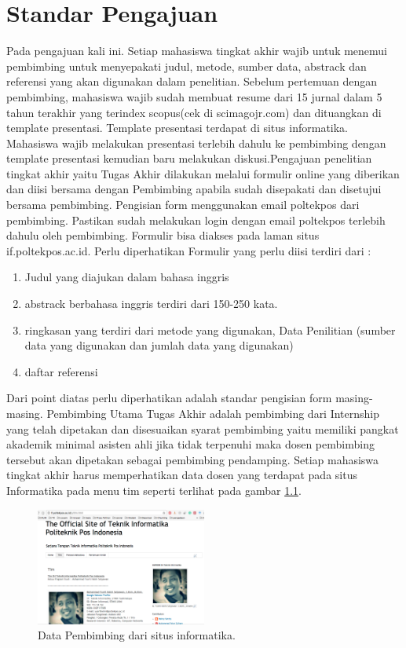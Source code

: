 \chapter{Standar Pengajuan}

Pada pengajuan kali ini. Setiap mahasiswa tingkat akhir wajib untuk menemui pembimbing untuk menyepakati judul, metode, sumber data, abstrack dan referensi yang akan digunakan dalam penelitian. Sebelum pertemuan dengan pembimbing, mahasiswa wajib sudah membuat resume dari 15 jurnal dalam 5 tahun terakhir yang terindex scopus(cek di scimagojr.com) dan dituangkan di template presentasi. Template presentasi terdapat di situs informatika. Mahasiswa wajib melakukan presentasi terlebih dahulu ke pembimbing dengan template presentasi kemudian baru melakukan diskusi.Pengajuan penelitian tingkat akhir yaitu Tugas Akhir dilakukan melalui formulir online yang diberikan dan diisi bersama dengan Pembimbing apabila sudah disepakati dan disetujui bersama pembimbing. Pengisian form menggunakan email poltekpos dari pembimbing. Pastikan sudah melakukan login dengan email poltekpos terlebih dahulu oleh pembimbing. Formulir bisa diakses pada laman situs if.poltekpos.ac.id. Perlu diperhatikan Formulir yang perlu diisi terdiri dari :
\begin{enumerate}
\item Judul yang diajukan dalam bahasa inggris
\item abstrack berbahasa inggris terdiri dari 150-250 kata.
\item ringkasan yang terdiri dari metode yang digunakan, Data Penilitian (sumber data yang digunakan dan jumlah data yang digunakan)
\item daftar referensi
\end{enumerate}
Dari point diatas perlu diperhatikan adalah standar pengisian form masing-masing. Pembimbing Utama Tugas Akhir adalah pembimbing dari Internship yang telah dipetakan dan disesuaikan syarat pembimbing yaitu memiliki pangkat akademik minimal asisten ahli jika tidak terpenuhi maka dosen pembimbing tersebut akan dipetakan sebagai pembimbing pendamping. Setiap mahasiswa tingkat akhir harus memperhatikan data dosen yang terdapat pada situs Informatika pada menu tim seperti terlihat pada gambar \ref{figure:timif}.
\begin{figure}[ht]
	\centerline{\includegraphics[width=0.5\textwidth]{figures/timif.png}}
	\caption{Data Pembimbing dari situs informatika.}
	\label{figure:timif}
	\end{figure}
